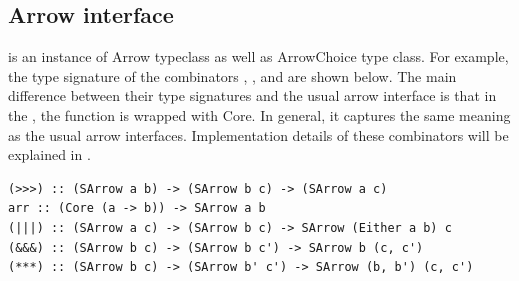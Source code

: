 \subsection{Arrow interface}
 is an instance of Arrow typeclass as well as ArrowChoice type class. For example, the type signature of the combinators \hask{>>>}, \hask{|||}, \hask{&&&} and  are shown below. The main difference between their type signatures and the usual arrow interface is that in the , the function is wrapped with Core. In general, it captures the same meaning as the usual arrow interfaces. Implementation details of these combinators will be explained in .
\begin{code}
\begin{verbatim}
(>>>) :: (SArrow a b) -> (SArrow b c) -> (SArrow a c)
arr :: (Core (a -> b)) -> SArrow a b
(|||) :: (SArrow a c) -> (SArrow b c) -> SArrow (Either a b) c
(&&&) :: (SArrow b c) -> (SArrow b c') -> SArrow b (c, c')
(***) :: (SArrow b c) -> (SArrow b' c') -> SArrow (b, b') (c, c')
\end{verbatim}
\end{code} %
